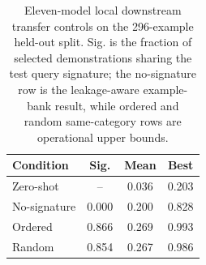 \begin{table}[H]
\centering
\footnotesize
\begin{tabular}{@{}lccc@{}}
\toprule
Condition & Sig. & Mean & Best \\
\midrule
Zero-shot & -- & 0.036 & 0.203 \\
No-signature & 0.000 & 0.200 & 0.828 \\
Ordered & 0.866 & 0.269 & 0.993 \\
Random & 0.854 & 0.267 & 0.986 \\
\bottomrule
\end{tabular}
\caption{Eleven-model local downstream transfer controls on the 296-example held-out split. Sig. is the fraction of selected demonstrations sharing the test query signature; the no-signature row is the leakage-aware example-bank result, while ordered and random same-category rows are operational upper bounds.}
\label{tab:downstream_transfer_summary_main}
\end{table}
